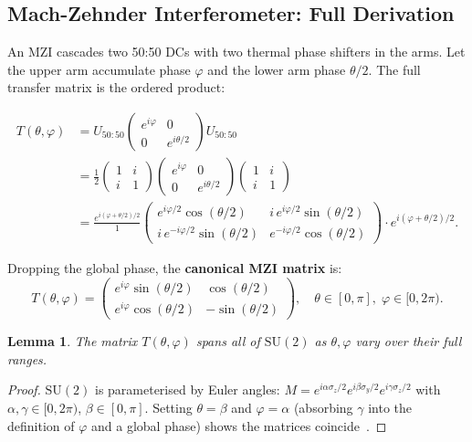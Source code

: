 \documentclass[12pt, a4paper]{article}
\newtheorem{lemma}{Lemma}[section]
\begin{document}
\subsection{Mach-Zehnder Interferometer: Full Derivation}

An MZI cascades two 50:50 DCs with two thermal phase shifters in the arms.
Let the upper arm accumulate phase $\varphi$ and the lower arm phase $\theta/2$.
The full transfer matrix is the ordered product:

\begin{align}
  T(\theta,\varphi)
  &= U_{50:50}
     \begin{pmatrix} e^{i\varphi} & 0 \\ 0 & e^{i\theta/2} \end{pmatrix}
     U_{50:50}
  \nonumber\\
  &= \frac{1}{2}
  \begin{pmatrix}1&i\\i&1\end{pmatrix}
  \begin{pmatrix}e^{i\varphi}&0\\0&e^{i\theta/2}\end{pmatrix}
  \begin{pmatrix}1&i\\i&1\end{pmatrix}
  \nonumber\\
  &= \frac{e^{i(\varphi+\theta/2)/2}}{1}
  \begin{pmatrix}
    e^{i\varphi/2}\cos(\theta/2) & i\,e^{i\varphi/2}\sin(\theta/2)\\[4pt]
    i\,e^{-i\varphi/2}\sin(\theta/2) & e^{-i\varphi/2}\cos(\theta/2)
  \end{pmatrix}
  \cdot e^{i(\varphi+\theta/2)/2}.
  \label{eq:mzi_full_derivation}
\end{align}

Dropping the global phase, the \textbf{canonical MZI matrix} is:
\begin{equation}
  \boxed{
  T(\theta,\varphi) =
  \begin{pmatrix}
    e^{i\varphi}\sin(\theta/2) &  \cos(\theta/2) \\[4pt]
    e^{i\varphi}\cos(\theta/2) & -\sin(\theta/2)
  \end{pmatrix},
  \quad \theta\in[0,\pi],\; \varphi\in[0,2\pi).
  }
  \label{eq:mzi_canonical}
\end{equation}

\begin{lemma}
  The matrix $T(\theta,\varphi)$ spans all of $\text{SU}(2)$ as $\theta,\varphi$
  vary over their full ranges.
\end{lemma}
\begin{proof}
  $\text{SU}(2)$ is parameterised by Euler angles:
  $M = e^{i\alpha\sigma_z/2}e^{i\beta\sigma_y/2}e^{i\gamma\sigma_z/2}$
  with $\alpha,\gamma\in[0,2\pi)$, $\beta\in[0,\pi]$.
  Setting $\theta=\beta$ and $\varphi=\alpha$ (absorbing $\gamma$ into the
  definition of $\varphi$ and a global phase) shows the matrices
  coincide~\cite{clements2016}.
\end{proof}
\end{document}
